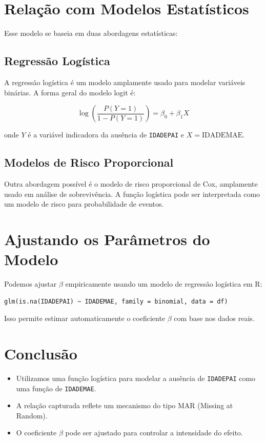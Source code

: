 \documentclass{article}
\begin{document}
\section{Relação com Modelos Estatísticos}

Esse modelo se baseia em duas abordagens estatísticas:

\subsection{Regressão Logística}

A regressão logística é um modelo amplamente usado para modelar variáveis binárias. A forma geral do modelo logit é:

\[
\log \left( \frac{P(Y=1)}{1 - P(Y=1)} \right) = \beta_0 + \beta_1 X
\]

onde \( Y \) é a variável indicadora da ausência de \texttt{IDADEPAI} e \( X = \text{IDADEMAE} \).

\subsection{Modelos de Risco Proporcional}

Outra abordagem possível é o modelo de risco proporcional de Cox, amplamente usado em análise de sobrevivência. A função logística pode ser interpretada como um modelo de risco para probabilidade de eventos.

\section{Ajustando os Parâmetros do Modelo}

Podemos ajustar \(\beta\) empiricamente usando um modelo de regressão logística em R:

\begin{verbatim}
glm(is.na(IDADEPAI) ~ IDADEMAE, family = binomial, data = df)
\end{verbatim}

Isso permite estimar automaticamente o coeficiente \(\beta\) com base nos dados reais.

\section{Conclusão}

\begin{itemize}
    \item Utilizamos uma função logística para modelar a ausência de \texttt{IDADEPAI} como uma função de \texttt{IDADEMAE}.
    \item A relação capturada reflete um mecanismo do tipo MAR (Missing at Random).
    \item O coeficiente \(\beta\) pode ser ajustado para controlar a intensidade do efeito.
\end{itemize}
\end{document}
